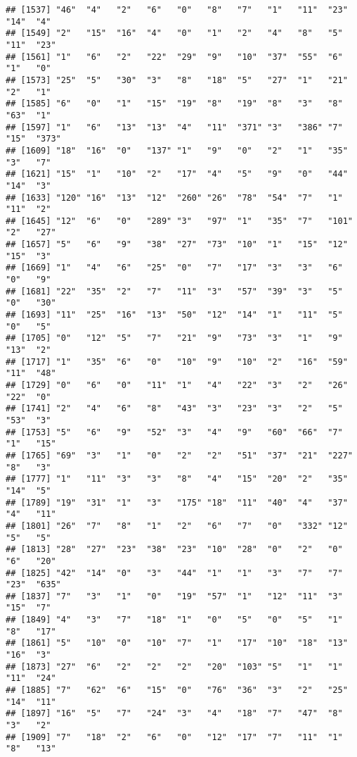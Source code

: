 \documentclass[
]{article}
\begin{document}
\begin{verbatim}
## [1537] "46"  "4"   "2"   "6"   "0"   "8"   "7"   "1"   "11"  "23"  "14"  "4"  
## [1549] "2"   "15"  "16"  "4"   "0"   "1"   "2"   "4"   "8"   "5"   "11"  "23" 
## [1561] "1"   "6"   "2"   "22"  "29"  "9"   "10"  "37"  "55"  "6"   "1"   "0"  
## [1573] "25"  "5"   "30"  "3"   "8"   "18"  "5"   "27"  "1"   "21"  "2"   "1"  
## [1585] "6"   "0"   "1"   "15"  "19"  "8"   "19"  "8"   "3"   "8"   "63"  "1"  
## [1597] "1"   "6"   "13"  "13"  "4"   "11"  "371" "3"   "386" "7"   "15"  "373"
## [1609] "18"  "16"  "0"   "137" "1"   "9"   "0"   "2"   "1"   "35"  "3"   "7"  
## [1621] "15"  "1"   "10"  "2"   "17"  "4"   "5"   "9"   "0"   "44"  "14"  "3"  
## [1633] "120" "16"  "13"  "12"  "260" "26"  "78"  "54"  "7"   "1"   "11"  "2"  
## [1645] "12"  "6"   "0"   "289" "3"   "97"  "1"   "35"  "7"   "101" "2"   "27" 
## [1657] "5"   "6"   "9"   "38"  "27"  "73"  "10"  "1"   "15"  "12"  "15"  "3"  
## [1669] "1"   "4"   "6"   "25"  "0"   "7"   "17"  "3"   "3"   "6"   "0"   "9"  
## [1681] "22"  "35"  "2"   "7"   "11"  "3"   "57"  "39"  "3"   "5"   "0"   "30" 
## [1693] "11"  "25"  "16"  "13"  "50"  "12"  "14"  "1"   "11"  "5"   "0"   "5"  
## [1705] "0"   "12"  "5"   "7"   "21"  "9"   "73"  "3"   "1"   "9"   "13"  "2"  
## [1717] "1"   "35"  "6"   "0"   "10"  "9"   "10"  "2"   "16"  "59"  "11"  "48" 
## [1729] "0"   "6"   "0"   "11"  "1"   "4"   "22"  "3"   "2"   "26"  "22"  "0"  
## [1741] "2"   "4"   "6"   "8"   "43"  "3"   "23"  "3"   "2"   "5"   "53"  "3"  
## [1753] "5"   "6"   "9"   "52"  "3"   "4"   "9"   "60"  "66"  "7"   "1"   "15" 
## [1765] "69"  "3"   "1"   "0"   "2"   "2"   "51"  "37"  "21"  "227" "8"   "3"  
## [1777] "1"   "11"  "3"   "3"   "8"   "4"   "15"  "20"  "2"   "35"  "14"  "5"  
## [1789] "19"  "31"  "1"   "3"   "175" "18"  "11"  "40"  "4"   "37"  "4"   "11" 
## [1801] "26"  "7"   "8"   "1"   "2"   "6"   "7"   "0"   "332" "12"  "5"   "5"  
## [1813] "28"  "27"  "23"  "38"  "23"  "10"  "28"  "0"   "2"   "0"   "6"   "20" 
## [1825] "42"  "14"  "0"   "3"   "44"  "1"   "1"   "3"   "7"   "7"   "23"  "635"
## [1837] "7"   "3"   "1"   "0"   "19"  "57"  "1"   "12"  "11"  "3"   "15"  "7"  
## [1849] "4"   "3"   "7"   "18"  "1"   "0"   "5"   "0"   "5"   "1"   "8"   "17" 
## [1861] "5"   "10"  "0"   "10"  "7"   "1"   "17"  "10"  "18"  "13"  "16"  "3"  
## [1873] "27"  "6"   "2"   "2"   "2"   "20"  "103" "5"   "1"   "1"   "11"  "24" 
## [1885] "7"   "62"  "6"   "15"  "0"   "76"  "36"  "3"   "2"   "25"  "14"  "11" 
## [1897] "16"  "5"   "7"   "24"  "3"   "4"   "18"  "7"   "47"  "8"   "3"   "2"  
## [1909] "7"   "18"  "2"   "6"   "0"   "12"  "17"  "7"   "11"  "1"   "8"   "13" 

\end{verbatim}
\end{document}
